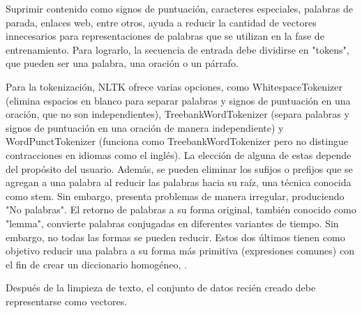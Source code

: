 Suprimir contenido como signos de puntuación, caracteres especiales, palabras de parada, enlaces web, entre otros, ayuda a reducir la cantidad de vectores innecesarios para representaciones de palabras que se utilizan en la fase de entrenamiento. Para lograrlo, la secuencia de entrada debe dividirse en "tokens", que pueden ser una palabra, una oración o un párrafo.

Para la tokenización, NLTK ofrece varias opciones, como WhitespaceTokenizer (elimina espacios en blanco para separar palabras y signos de puntuación en una oración, que no son independientes), TreebankWordTokenizer (separa palabras y signos de puntuación en una oración de manera independiente) y WordPunctTokenizer (funciona como TreebankWordTokenizer pero no distingue contracciones en idiomas como el inglés). La elección de alguna de estas depende del propósito del usuario. Además, se pueden eliminar los sufijos o prefijos que se agregan a una palabra al reducir las palabras hacia su raíz, una técnica conocida como stem. Sin embargo, presenta problemas de manera irregular, produciendo "No palabras". El retorno de palabras a su forma original, también conocido como "lemma", convierte palabras conjugadas en diferentes variantes de tiempo. Sin embargo, no todas las formas se pueden reducir. Estos dos últimos tienen como objetivo reducir una palabra a su forma más primitiva (expresiones comunes) con el fin de crear un diccionario homogéneo, \parencite{tec_zimovnov2018text_preprocessing}.

Después de la limpieza de texto, el conjunto de datos recién creado debe representarse como vectores.

\newpage